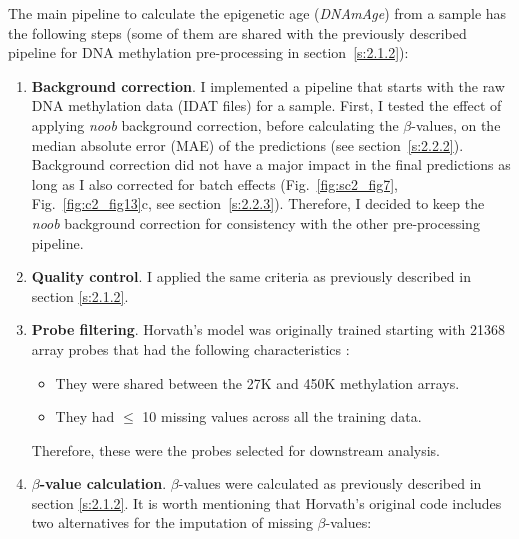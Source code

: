 \bigskip

The main pipeline to calculate the epigenetic age (\textit{DNAmAge}) from a sample has the following steps (some of them are shared with the previously described pipeline for DNA methylation pre-processing in section~\ref{s:2.1.2}):

\begin{enumerate}
	
	\item \textbf{Background correction}. I implemented a pipeline that starts with the raw DNA methylation data (IDAT files) for a sample. First, I tested the effect of applying \textit{noob} background correction, before calculating the $\beta$-values, on the median absolute error (MAE) of the predictions (see section~\ref{s:2.2.2}).  Background correction did not have a major impact in the final predictions as long as I also corrected for batch effects (Fig.~\ref{fig:sc2_fig7}, Fig.~\ref{fig:c2_fig13}c, see section~\ref{s:2.2.3}). Therefore, I decided to keep the \textit{noob} background correction for consistency with the other pre-processing pipeline.
	
	\item \textbf{Quality control}. I applied the same criteria as previously described in section \ref{s:2.1.2}.
	
	\item \textbf{Probe filtering}. Horvath's model was originally trained starting with 21368 array probes that had the following characteristics \cite{Horvath2013}:
	
	\begin{itemize}
		
		\item They were shared between the 27K and 450K methylation arrays.
		
		\item They had $\leq$ 10 missing values across all the training data.
		
	\end{itemize}
	
	 Therefore, these were the probes selected for downstream analysis.
	
	\item \textbf{$\beta$-value calculation}. $\beta$-values were calculated as previously described in section \ref{s:2.1.2}. It is worth mentioning that Horvath's original code includes two alternatives for the imputation of missing $\beta$-values:
	
	\begin{itemize}
		

\end{itemize}
\end{enumerate}
